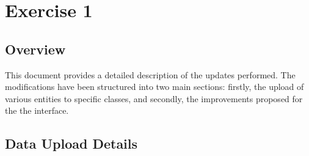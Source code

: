 \section{Exercise 1}

\subsection{Overview}

This document provides a detailed description of the updates performed. The modifications have been structured into two main sections: firstly, the upload of various entities to specific classes, and secondly, the improvements proposed for the the interface.

\subsection{Data Upload Details}


